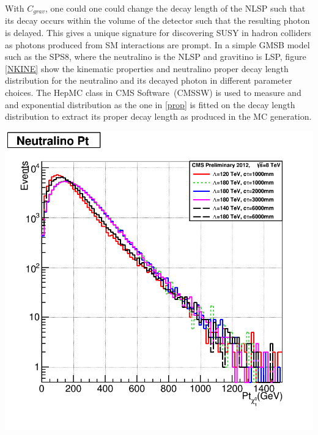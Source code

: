 {With $C_{grav}$, one could  one could change the decay length of the NLSP such that its decay occurs within the volume of the detector such that the resulting photon is delayed. This gives a unique signature for discovering SUSY in hadron colliders as photons produced from SM interactions are prompt.
In a simple GMSB model such as the SPS8, where the neutralino is the NLSP and gravitino is LSP, figure \eqref{NKINE} show the kinematic properties and neutralino proper decay length distribution for the neutralino and its decayed photon in different  parameter choices. The HepMC class in CMS Software~(CMSSW) is used to measure and and exponential distribution as the one in \eqref{prop} is fitted on the decay length distribution to extract its proper decay length as produced in the MC generation.
\begin{center}
\centering
\mbox{\includegraphics[scale=0.3]{THESISPLOTS/GMSB-SPS8-MODEL-Neutralinio-Pt.png} \hspace{-1cm}
}
\end{center}}
